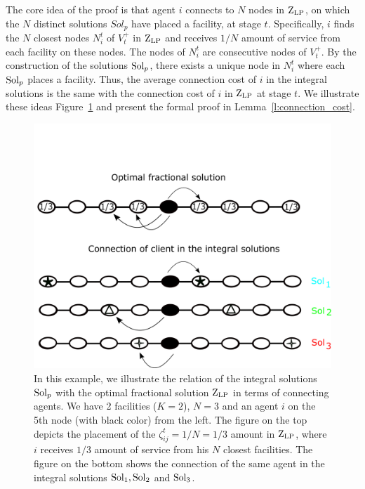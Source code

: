 The core idea of the proof is that agent $i$ connects to $N$ nodes in $\mathrm{Z}_{\mathrm{LP}}$, on which the $N$ distinct solutions $Sol_p$ have placed a facility, at stage $t$. Specifically, $i$ finds the $N$ closest nodes $N_i^t$ of $V_t^+$ in $\mathrm{Z}_{\mathrm{LP}}$ and receives $1/N$ amount of service from each facility on these nodes. The nodes of $N_i^t$ are consecutive nodes of $V_t^+$. By the construction of the solutions $\mathrm{Sol}_p$, there exists a unique node in $N_i^t$ where each $\mathrm{Sol}_p$ places a facility. 
Thus, the average connection cost of $i$ in the integral solutions is the same with the connection cost of $i$ in $\mathrm{Z}_{\mathrm{LP}}$ at stage $t$. We illustrate these ideas Figure~\ref{fig:ConCost} and present the formal proof in Lemma~\ref{l:connection_cost}.

\begin{figure}[t]
    \centering
    \includegraphics[scale=0.14]{connectioncost.png}
    \caption{In this example, we illustrate the relation of the integral solutions $\mathrm{Sol}_p$ with the optimal fractional solution $\mathrm{Z}_{\mathrm{LP}}$ in terms of connecting agents. We have 2 facilities ($K=2$), $N=3$ and an agent $i$ on the  5th node (with black color) from the left. The figure on the top depicts the placement of the $\zeta_{ij}^t=1/N=1/3$ amount in $\mathrm{Z}_{\mathrm{LP}}$, where $i$ receives $1/3$ amount of service from his $N$ closest facilities. The figure on the bottom shows the connection of the same agent in the integral solutions $\mathrm{Sol}_1, \mathrm{Sol}_2$ and $\mathrm{Sol}_3$.}
    \label{fig:ConCost}
\end{figure}

